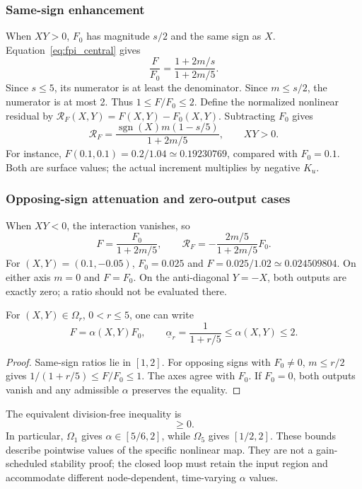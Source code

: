 \subsubsection{Same-sign enhancement}
When $XY>0$, $F_0$ has magnitude $s/2$ and the same sign as $X$.
Equation~\eqref{eq:fpi_central} gives
\begin{equation}
 \frac{F}{F_0}=\frac{1+2m/s}{1+2m/5}.
 \label{eq:fpi_same_sign}
\end{equation}
Since $s\le5$, its numerator is at least the denominator. Since
$m\le s/2$, the numerator is at most 2. Thus $1\le F/F_0\le2$.
Define the normalized nonlinear residual by
$\mathcal R_F(X,Y)=F(X,Y)-F_0(X,Y)$. Subtracting $F_0$ gives
\begin{equation}
 \mathcal R_F=
 \frac{\operatorname{sgn}(X)m(1-s/5)}{1+2m/5},\qquad XY>0.
 \label{eq:fpd_same_residual}
\end{equation}
For instance, $F(0.1,0.1)=0.2/1.04\simeq0.19230769$, compared with
$F_0=0.1$. Both are surface values; the actual increment multiplies by
negative $K_u$.

\subsubsection{Opposing-sign attenuation and zero-output cases}
When $XY<0$, the interaction vanishes, so
\begin{equation}
 F=\frac{F_0}{1+2m/5},\qquad
 \mathcal R_F=-\frac{2m/5}{1+2m/5}F_0.
 \label{eq:fpi_opposite_sign}
\end{equation}
For $(X,Y)=(0.1,-0.05)$, $F_0=0.025$ and
$F=0.025/1.02\simeq0.024509804$. On either axis $m=0$ and $F=F_0$.
On the anti-diagonal $Y=-X$, both outputs are exactly zero; a ratio should
not be evaluated there.

\begin{btdcorollary}
\label{cor:fpi_sector}
For $(X,Y)\in\Omega_r$, $0<r\le5$, one can write
\begin{equation}
 F=\alpha(X,Y)F_0,\qquad
 \underline\alpha_r=\frac1{1+r/5}\le\alpha(X,Y)\le2.
 \label{eq:fpi_sector}
\end{equation}
\end{btdcorollary}
\begin{proof}
Same-sign ratios lie in $[1,2]$. For opposing signs with $F_0\ne0$,
$m\le r/2$ gives $1/(1+r/5)\le F/F_0\le1$.
The axes agree with $F_0$. If $F_0=0$, both outputs vanish and any
admissible $\alpha$ preserves the equality.
\end{proof}
The equivalent division-free inequality is
\begin{equation}
 [F-\underline\alpha_r F_0][2F_0-F]\ge0.
 \label{eq:fpi_sector_product}
\end{equation}
In particular, $\Omega_1$ gives $\alpha\in[5/6,2]$, while
$\Omega_5$ gives $[1/2,2]$. These bounds describe pointwise values of
the specific nonlinear map. They are not a gain-scheduled stability proof;
the closed loop must retain the input region and accommodate different
node-dependent, time-varying $\alpha$ values.

